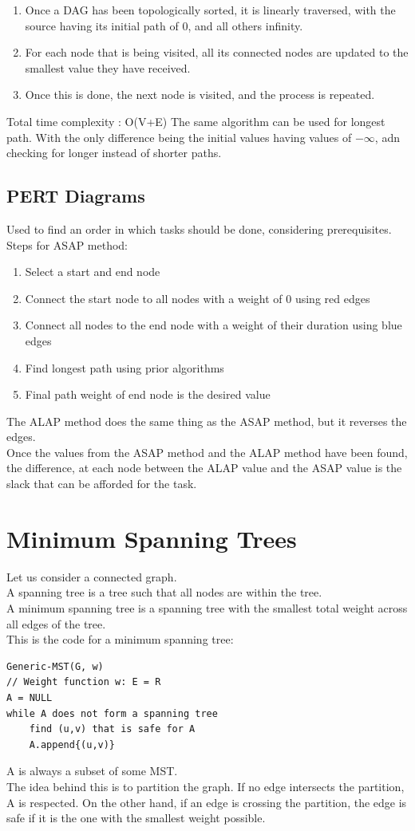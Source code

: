 \documentclass[nobib]{tufte-handout}
\begin{document}
\begin{enumerate}
    \item Once a DAG has been topologically sorted, it is linearly traversed, with the source having its initial path of 0, and all others infinity.
    \item For each node that is being visited, all its connected nodes are updated to the smallest value they have received.
    \item Once this is done, the next node is visited, and the process is repeated.
\end{enumerate}
Total time complexity : O(V+E)
The same algorithm can be used for longest path. With the only difference being the initial values having values of $-\infty$, adn checking for longer instead of shorter paths.\\
\subsection{PERT Diagrams}
Used to find an order in which tasks should be done, considering prerequisites.\\
Steps for ASAP method:
\begin{enumerate}
    \item Select a start and end node
    \item Connect the start node to all nodes with a weight of 0 using red edges
    \item Connect all nodes to the end node with a weight of their duration using blue edges
    \item Find longest path using prior algorithms
    \item Final path weight of end node is the desired value
\end{enumerate}
The ALAP method does the same thing as the ASAP method, but it reverses the edges.\\
Once the values from the ASAP method and the ALAP method have been found, the difference, at each node between the ALAP value and the ASAP value is the slack that can be afforded for the task.\\
\section{Minimum Spanning Trees}
Let us consider a connected graph.\\ 
A spanning tree is a tree such that all nodes are within the tree.\\
A minimum spanning tree is a spanning tree with the smallest total weight across all edges of the tree.\\
This is the code for a minimum spanning tree:
\begin{lstlisting}
Generic-MST(G, w)
// Weight function w: E = R
A = NULL
while A does not form a spanning tree
    find (u,v) that is safe for A
    A.append{(u,v)}
\end{lstlisting}
A is always a subset of some MST.\\
The idea behind this is to partition the graph. If no edge intersects the partition, A is respected. On the other hand, if an edge is crossing the partition, the edge is safe if it is the one with the smallest weight possible.\\
\end{document}
